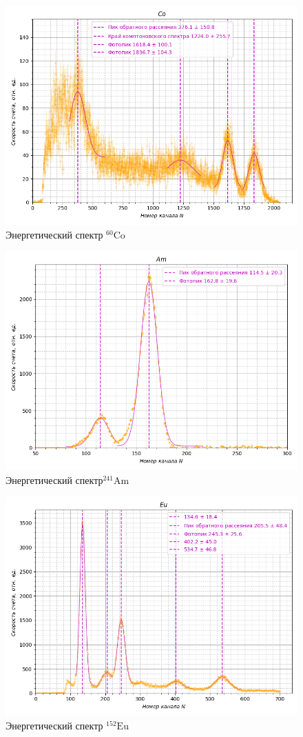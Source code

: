\documentclass{article}
\begin{document}
\begin{figure}[h!]
        \centering
        \includegraphics[width = 11 cm]{Cco.png}
        \caption{Энергетический спектр $\mathrm{^{60}Co} $}
        \label{Co}
    \end{figure}

\begin{figure}[h!]
        \centering
        \includegraphics[width = 11 cm]{Aam.png}
        \caption{Энергетический спектр$\mathrm{^{241}Am} $}
        \label{Am}
    \end{figure}

\begin{figure}[h!]
        \centering
        \includegraphics[width = 11 cm]{EEU.png}
        \caption{Энергетический спектр $\mathrm{^{152}Eu}$ }
        \label{Eu}
    \end{figure}
\end{document}
